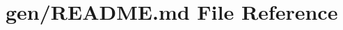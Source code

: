 \hypertarget{gen_2_r_e_a_d_m_e_8md}{}\section{gen/\+R\+E\+A\+D\+ME.md File Reference}
\label{gen_2_r_e_a_d_m_e_8md}
